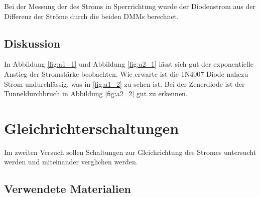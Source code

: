 \documentclass[12pt,a4paper]{article}
\begin{document}
Bei der Messung der des Stroms in Sperrrichtung wurde der Diodenstrom aus der Differenz der Ströme durch die beiden DMMs berechnet.

\subsection{Diskussion}
In Abbildung \ref{fig:a1_1} und Abbildung \ref{fig:a2_1} lässt sich gut der exponentielle Anstieg der Stromstärke beobachten. Wie erwarte ist die 1N4007 Diode nahezu Strom undurchlässig, was in \ref{fig:a1_2} zu sehen ist. Bei der Zenerdiode ist der Tunneldurchbruch in Abbildung \ref{fig:a2_2} gut zu erkennen.

\section{Gleichrichterschaltungen}
Im zweiten Versuch sollen Schaltungen zur Gleichrichtung des Stromes untersucht werden und miteinander verglichen werden.
\subsection{Verwendete Materialien}
\end{document}
